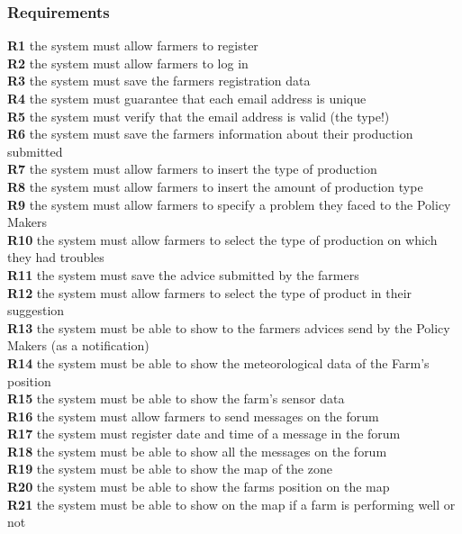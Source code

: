 \subsubsection{Requirements}
\textbf{R1} the system must allow farmers to register\\
\textbf{R2} the system must allow farmers to log in\\
\textbf{R3} the system must save the farmers registration data\\
\textbf{R4} the system must guarantee that each email address is unique\\
\textbf{R5} the system must verify that the email address is valid (the type!)\\
\textbf{R6} the system must save the farmers information about their production submitted\\
\textbf{R7} the system must allow farmers to insert the type of production \\
\textbf{R8} the system must allow farmers to insert the amount of production type\\
\textbf{R9} the system must allow farmers to specify a problem they faced to the Policy Makers\\
\textbf{R10} the system must allow farmers to select the type of production on which they had troubles\\
\textbf{R11} the system must save the advice submitted by the farmers\\
\textbf{R12} the system must allow farmers to select the type of product in their suggestion\\
\textbf{R13} the system must be able to show to the farmers advices send by the Policy Makers (as a notification)\\
\textbf{R14} the system must be able to show the meteorological data of the Farm’s position\\
\textbf{R15} the system must be able to show the farm’s sensor data \\
\textbf{R16} the system must allow farmers to send messages on the forum\\
\textbf{R17} the system must register date and time of a message in the forum\\
\textbf{R18} the system must be able to show all the messages on the forum\\
\textbf{R19} the system must be able to show the map of the zone\\
\textbf{R20} the system must be able to show the farms position on the map\\
\textbf{R21} the system must be able to show on the map if a farm is performing well or not \\
